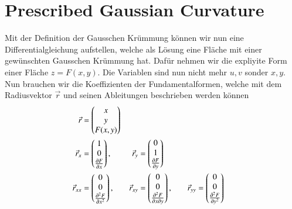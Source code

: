 %
%
%
%
\section{Prescribed Gaussian Curvature
\label{mongeampere:section:teil2}}
Mit der Definition der Gausschen Krümmung können wir nun eine Differentialgleichung aufstellen,
welche als Lösung eine Fläche mit einer gewünschten Gausschen Krümmung hat.
Dafür nehmen wir die expliyite Form einer Fläche $z = F(x,y)$.
Die Variablen sind nun nicht mehr $u, v$ sonder $x, y$.
Nun brauchen wir die Koeffizienten der Fundamentalformen, welche mit dem Radiusvektor $\vec r$ und seinen Ableitungen 
beschrieben werden können
\begin{align}
  \vec r &= \begin{pmatrix}
   x \\
   y \\
   F(x, y)
 \end{pmatrix} \\
    \vec r_x &= \begin{pmatrix}
      1 \\
      0 \\
      \pdv{F}{x}
    \end{pmatrix},
      \quad &
    \vec r_y &= \begin{pmatrix}
      0 \\
      1 \\
      \pdv{F}{y}
    \end{pmatrix}\\
      \vec r_{xx} &= \begin{pmatrix}
      0 \\
      0 \\
      \pdv[2]{F}{x}
    \end{pmatrix},
    \quad &
    \vec r_{xy} &= \begin{pmatrix}
      0 \\
      0 \\
      \pdv{F}{x}{y}
    \end{pmatrix},
      \quad &
    \vec r_{yy} &= \begin{pmatrix}
      0 \\
      0 \\
      \pdv[2]{F}{y}
    \end{pmatrix}\\
\end{align}

